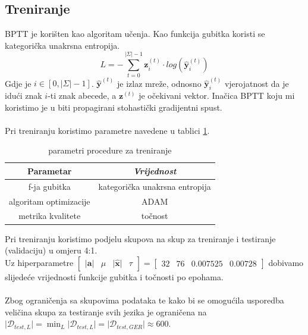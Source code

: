 \documentclass[conference]{IEEEtran}
\begin{document}
\subsection{Treniranje} \label{subsect:trening}
BPTT je korišten kao algoritam učenja.
Kao funkcija gubitka koristi se kategorička unakrsna entropija.
\begin{equation}
L = - \sum_{t = 0}^{\lvert \Sigma \rvert-1} \mathbf{z}_i^{(t)} \cdot log(\hat{\mathbf{y}}_i^{(t)})
\end{equation}
Gdje je $i \in [0, \lvert \Sigma \rvert - 1]$. $\hat{\mathbf{y}}^{(t)}$ je izlaz mreže, odnosno $\hat{\mathbf{y}}_i^{(t)}$ vjerojatnost da je idući znak $i$-ti znak abecede, a $\mathbf{z}^{(t)}$ je očekivani vektor.
Inačica BPTT koju mi koristimo je u biti propagirani stohastički gradijentni spust.\\
\\
Pri treniranju koristimo parametre navedene u tablici \ref{tab:trening}.
\begin{table}[htbp]
\caption{parametri procedure za treniranje}
\begin{center}
\begin{tabular}{|c|c|}
\hline
\textbf{Parametar} & \textbf{\textit{Vrijednost}}\\ \hline
f-ja gubitka & kategorička unakrsna entropija \\ \hline
algoritam optimizacije & ADAM \\ \hline
metrika kvalitete & točnost \\ \hline
\end{tabular}
\label{tab:trening}
\end{center}
\end{table}

Pri treniranju koristimo podjelu skupova na skup za treniranje i testiranje (validaciju) u omjeru 4:1.\\
Uz hiperparametre $\begin{bmatrix} \lvert \mathbf{a} \rvert & \mu & \lvert \mathbf{\hat{x}} \rvert & \tau \end{bmatrix} = \begin{bmatrix} 32 & 76 & 0.007525 & 0.00728 \end{bmatrix}$ dobivamo slijedeće vrijednosti funkcije gubitka i točnosti po epohama.\\
\\
Zbog ograničenja sa skupovima podataka te kako bi se omogućila usporedba veličina skupa za testiranje svih jezika je ograničena na $\lvert \mathcal{D}_{test, L} \rvert = \min_{L} \lvert \mathcal{D}_{test, L} \rvert = \lvert \mathcal{D}_{test, GER} \rvert \approx 600$.
\end{document}
